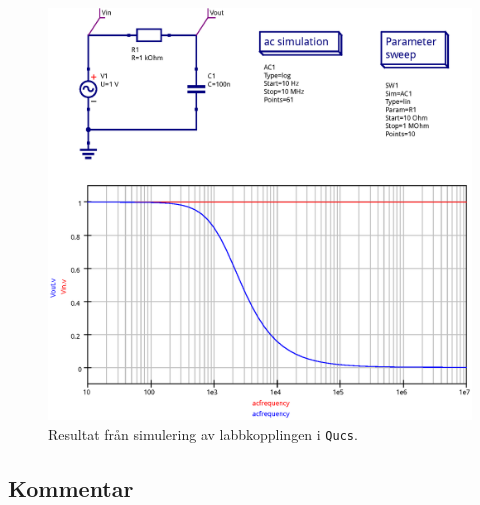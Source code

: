 \begin{figure}
    \centering
    \includegraphics[width=\linewidth]{sim/ee466_lab-4_prj/uppgift-1}
    \caption[Labbkopplingens frekvensåtergivning. Simulering i \texttt{Qucs}.]
    {Resultat från simulering av labbkopplingen i \texttt{Qucs}.}
    \label{bode-sim}
\end{figure}


\subsection{Kommentar}\label{}


